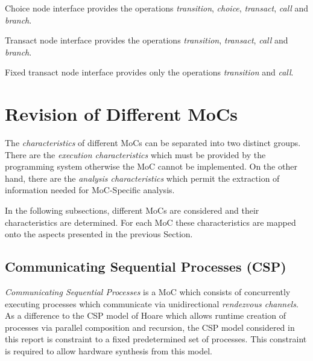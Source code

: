 \begin{definition}\label{choice-node-interface-type}
Choice node interface provides the operations
\emph{transition}, \emph{choice}, \emph{transact}, \emph{call} and \emph{branch}.
\end{definition}

\begin{definition}\label{transact-node-interface-type}
Transact node interface provides the operations
\emph{transition}, \emph{transact}, \emph{call} and \emph{branch}.
\end{definition}

\begin{definition}\label{fixed-transact-node-interface-type}
Fixed transact node interface provides only the operations
\emph{transition} and \emph{call}.
\end{definition}


\section{Revision of Different MoCs}\label{revision-of-mocs}

The \emph{characteristics} of different MoCs can be separated into two distinct groups.
There are the \emph{execution characteristics} which must be provided by
the programming system otherwise the MoC cannot be implemented.
On the other hand, there are the \emph{analysis characteristics} which
permit the extraction of information needed for MoC-Specific analysis.

In the following subsections, different MoCs are considered and their
characteristics are determined. For each MoC these characteristics are
mapped onto the aspects presented in the previous Section.

\subsection{Communicating Sequential Processes (CSP)}
\emph{Communicating Sequential Processes} \cite{csphoare:1985}
is a MoC which consists of concurrently executing processes
which communicate via unidirectional \emph{rendezvous channels}.
As a difference to the CSP model of Hoare \cite{csphoare:1985}
which allows runtime creation of processes via parallel
composition and recursion, the CSP model considered in this report
is constraint to a fixed predetermined set of processes.
This constraint is required to allow hardware synthesis from this
model.

